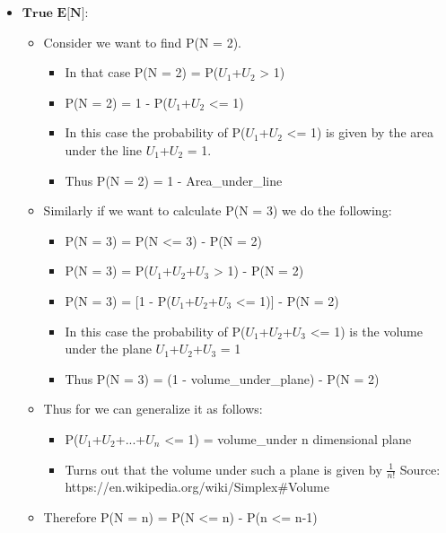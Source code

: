 \documentclass[11pt]{article}
\begin{document}
    \begin{itemize}
\item
  \(\textbf{True E[N]}\):

  \begin{itemize}
  \item
    Consider we want to find P(N = 2).

    \begin{itemize}
    \item
      In that case P(N = 2) = P(\(U_1\)+\(U_2\) \textgreater{} 1)
    \item
      P(N = 2) = 1 - P(\(U_1\)+\(U_2\) \textless{}= 1)
    \item
      In this case the probability of P(\(U_1\)+\(U_2\) \textless{}= 1)
      is given by the area under the line \(U_1\)+\(U_2\) = 1.
    \item
      Thus P(N = 2) = 1 - Area\_under\_line
    \end{itemize}
  \item
    Similarly if we want to calculate P(N = 3) we do the following:

    \begin{itemize}
    \item
      P(N = 3) = P(N \textless{}= 3) - P(N = 2)
    \item
      P(N = 3) = P(\(U_1\)+\(U_2\)+\(U_3\) \textgreater{} 1) - P(N = 2)
    \item
      P(N = 3) = {[}1 - P(\(U_1\)+\(U_2\)+\(U_3\) \textless{}= 1){]} -
      P(N = 2)
    \item
      In this case the probability of P(\(U_1\)+\(U_2\)+\(U_3\)
      \textless{}= 1) is the volume under the plane
      \(U_1\)+\(U_2\)+\(U_3\) = 1
    \item
      Thus P(N = 3) = (1 - volume\_under\_plane) - P(N = 2)
    \end{itemize}
  \item
    Thus for we can generalize it as follows:

    \begin{itemize}
    \item
      P(\(U_1\)+\(U_2\)+...+\(U_n\) \textless{}= 1) = volume\_under n
      dimensional plane
    \item
      Turns out that the volume under such a plane is given by
      \(\frac{1}{n!}\) Source:
      https://en.wikipedia.org/wiki/Simplex\#Volume
    \end{itemize}
  \item
    Therefore P(N = n) = P(N \textless{}= n) - P(n \textless{}= n-1)


\end{itemize}
\end{itemize}
\end{document}
